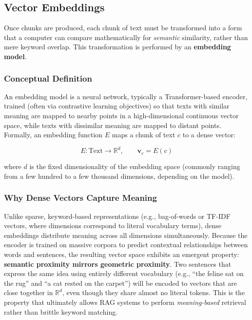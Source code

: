 \documentclass[11pt,a4paper]{article}
\begin{document}
\subsection{Vector Embeddings}

Once chunks are produced, each chunk of text must be transformed into a form that a computer can compare mathematically for \emph{semantic} similarity, rather than mere keyword overlap. This transformation is performed by an \textbf{embedding model}.

\subsubsection{Conceptual Definition}

An embedding model is a neural network, typically a Transformer-based encoder, trained (often via contrastive learning objectives) so that texts with similar meaning are mapped to nearby points in a high-dimensional continuous vector space, while texts with dissimilar meaning are mapped to distant points. Formally, an embedding function $E$ maps a chunk of text $c$ to a dense vector:

\begin{equation}
E: \text{Text} \longrightarrow \mathbb{R}^{d}, \qquad \mathbf{v}_c = E(c)
\end{equation}

where $d$ is the fixed dimensionality of the embedding space (commonly ranging from a few hundred to a few thousand dimensions, depending on the model).

\subsubsection{Why Dense Vectors Capture Meaning}

Unlike sparse, keyword-based representations (e.g., bag-of-words or TF-IDF vectors, where dimensions correspond to literal vocabulary terms), dense embeddings distribute meaning across all dimensions simultaneously. Because the encoder is trained on massive corpora to predict contextual relationships between words and sentences, the resulting vector space exhibits an emergent property: \textbf{semantic proximity mirrors geometric proximity}. Two sentences that express the same idea using entirely different vocabulary (e.g., ``the feline sat on the rug'' and ``a cat rested on the carpet'') will be encoded to vectors that are close together in $\mathbb{R}^d$, even though they share almost no literal tokens. This is the property that ultimately allows RAG systems to perform \emph{meaning-based} retrieval rather than brittle keyword matching.
\end{document}
